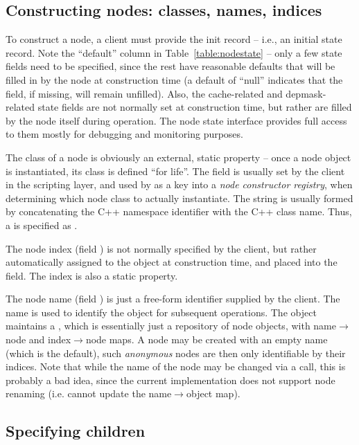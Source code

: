 \subsection{Constructing nodes: classes, names, indices}

  To construct a node, a client must provide the init record -- i.e., an
  initial state record. Note the ``default'' column in
  Table~\ref{table:nodestate} -- only a few state fields need to be specified,
  since the rest have reasonable defaults that will be filled in by the node at
  construction time (a default of ``null'' indicates that the field, if
  missing, will remain unfilled). Also, the cache-related and depmask-related
  state fields are not normally set at construction time, but rather are filled
  by the node itself during operation. The node state interface provides full
  access to them mostly for debugging and monitoring purposes.

  The class of a node is obviously an external, static property -- once a node
  object is instantiated, its class is defined ``for life''. The 
  field is usually set by the client in the scripting layer, and used by 
   as a key into a {\em node constructor registry},
  when determining which node class to actually instantiate. The 
  string is usually formed by concatenating the C++ namespace identifier with
  the C++ class name. Thus, a  is specified as .
 
  The node index (field ) is not normally specified by the client, but
  rather automatically assigned to the object at construction time, and placed
  into the  field. The index is also a static property.

  The node name (field ) is just a free-form identifier supplied by
  the client. The name is used to identify the object for subsequent
  operations. The  object maintains a , which is essentially
  just a repository of node objects, with name$\rightarrow$node and 
  index$\rightarrow$node maps. A node may be created with an empty name (which
  is the default), such {\em anonymous} nodes are then only identifiable by
  their indices. Note that while the name of the node may be changed via a
   call, this is probably a bad idea, since the current
   implementation does not support node renaming (i.e. cannot update
  the name$\rightarrow$object map).

\subsection{Specifying children} 
  \label{sec:children}
  
